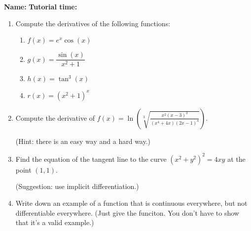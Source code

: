 \documentclass[12pt]{article}
\newcommand{\points}[1]{\marginpar{\hspace{24pt}[#1]}}
\newcommand{\di}{\displaystyle}
\begin{document}
{\bf \large Name:} \hspace{2.5in} {\bf Tutorial time:}

\bigskip

\bigskip

\thispagestyle{fancy}

 \begin{enumerate}
 \item  Compute the derivatives of the following functions:
\begin{enumerate}
 \item $f(x) = e^x\cos(x)$ \points{2}

\vspace{1.5in}

 \item $g(x) = \dfrac{\sin(x)}{x^2+1}$ \points{2}

\vspace{2in}

 \item $h(x) = \tan^3(x)$ \points{2}

\vspace{1.5in}

 \item $r(x) = (x^2+1)^x$ \points{2}

\end{enumerate}
\newpage

\item Compute the derivative of $\di f(x)=\ln\left(\sqrt[3]{\frac{x^2(x-3)^3}{(x^4+4x)(2x-1)^4}}\right)$. \points{3}

(Hint: there is an easy way and a hard way.)

\vspace{3.5in}

\item Find the equation of the tangent line to the curve $(x^2+y^2)^2=4xy$ at the point $(1,1)$. \points{3}

(Suggestion: use implicit differentiation.)

\vspace{3.5in}

\item Write down an example of a function that is continuous everywhere, \points{1} but not differentiable everywhere. (Just give the funciton. You don't have to show that it's a valid example.)
\end{enumerate}
\end{document}
